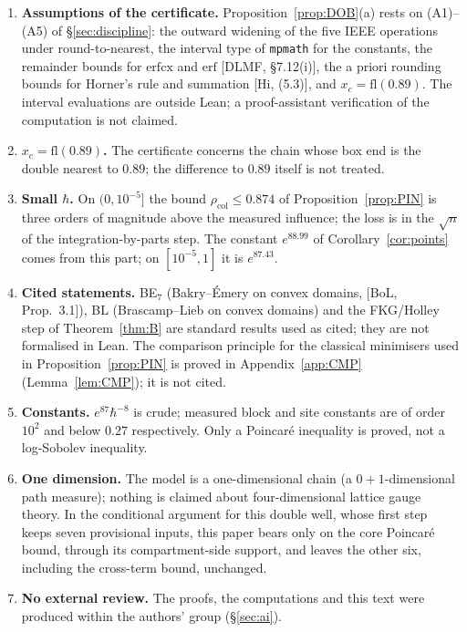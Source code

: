 \documentclass[11pt,a4paper]{article}
\theoremstyle{definition}
\theoremstyle{remark}
\newcommand{\xc}{x_c}
\newcommand{\rcol}{\rho_{\mathrm{col}}}
\newcommand{\code}[1]{\texttt{#1}}
\begin{document}
\begin{enumerate}[leftmargin=*]
\item \textbf{Assumptions of the certificate.} Proposition~\ref{prop:DOB}(a) rests on (A1)--(A5) of \S\ref{sec:discipline}: the outward widening of the five IEEE operations under round-to-nearest, the interval type of \code{mpmath} for the constants, the remainder bounds for $\mathrm{erfcx}$ and $\mathrm{erf}$ [DLMF, \S7.12(i)], the a priori rounding bounds for Horner's rule and summation [Hi, (5.3)], and $\xc=\mathrm{fl}(0.89)$. The interval evaluations are outside Lean; a proof-assistant verification of the computation is not claimed.
\item \textbf{$\xc=\mathrm{fl}(0.89)$.} The certificate concerns the chain whose box end is the double nearest to $0.89$; the difference to $0.89$ itself is not treated.
\item \textbf{Small $\hbar$.} On $(0,10^{-5}]$ the bound $\rcol\le0.874$ of Proposition~\ref{prop:PIN} is three orders of magnitude above the measured influence; the loss is in the $\sqrt n$ of the integration-by-parts step. The constant $e^{88.99}$ of Corollary~\ref{cor:points} comes from this part; on $[10^{-5},1]$ it is $e^{87.43}$.
\item \textbf{Cited statements.} BE$_7$ (Bakry--\'Emery on convex domains, [BoL, Prop.~3.1]), BL (Brascamp--Lieb on convex domains) and the FKG/Holley step of Theorem~\ref{thm:B} are standard results used as cited; they are not formalised in Lean. The comparison principle for the classical minimisers used in Proposition~\ref{prop:PIN} is proved in Appendix~\ref{app:CMP} (Lemma~\ref{lem:CMP}); it is not cited.
\item \textbf{Constants.} $e^{87}\hbar^{-8}$ is crude; measured block and site constants are of order $10^2$ and below $0.27$ respectively. Only a Poincar\'e inequality is proved, not a log-Sobolev inequality.
\item \textbf{One dimension.} The model is a one-dimensional chain (a $0+1$-dimensional path measure); nothing is claimed about four-dimensional lattice gauge theory. In the conditional argument for this double well, whose first step keeps seven provisional inputs, this paper bears only on the core Poincar\'e bound, through its compartment-side support, and leaves the other six, including the cross-term bound, unchanged.
\item \textbf{No external review.} The proofs, the computations and this text were produced within the authors' group (\S\ref{sec:ai}).
\end{enumerate}
\end{document}
